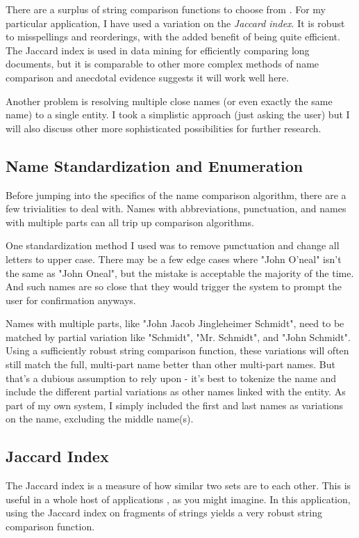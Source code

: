 \documentclass[11pt]{article}
\begin{document}
There are a surplus of string comparison functions to choose from \cite{comparison}.
For my particular application, I have used a variation on the {\em Jaccard index}.
It is robust to misspellings and reorderings, with the added benefit of being quite efficient.
The Jaccard index is used in data mining for efficiently comparing long documents,
but it is comparable to other more complex methods of name comparison \cite{comparison} and 
anecdotal evidence suggests it will work well here.

Another problem is resolving multiple close names (or even exactly the same name) to a single entity.
I took a simplistic approach (just asking the user) but I will also discuss other more
sophisticated possibilities for further research. 

\subsection{Name Standardization and Enumeration}
Before jumping into the specifics of the name comparison algorithm, there are a few trivialities
to deal with. Names with abbreviations, punctuation, and names with multiple parts can all
trip up comparison algorithms.

One standardization method I used was to remove punctuation and change all letters to upper case.
There may be a few edge cases where "John O'neal" isn't the same as "John Oneal",
but the mistake is acceptable the majority of the time. And such names are so close that they would
trigger the system to prompt the user for confirmation anyways.

Names with multiple parts, like "John Jacob Jingleheimer Schmidt", need to be matched by
partial variation like "Schmidt", "Mr. Schmidt", and "John Schmidt". 
Using a sufficiently robust string comparison function, these variations will often 
still match the full, multi-part name better than other multi-part names.
But that's a dubious assumption to rely upon - it's best to tokenize the name and
include the different partial variations as other names linked with the entity.
As part of my own system, I simply included the first and last names as variations on
the name, excluding the middle name(s).

\subsection{Jaccard Index}
The Jaccard index is a measure of how similar two sets are to each other.
This is useful in a whole host of applications \cite{general}, as you might imagine. 
In this application, using the Jaccard index on fragments of strings yields a very
robust string comparison function.
\end{document}
